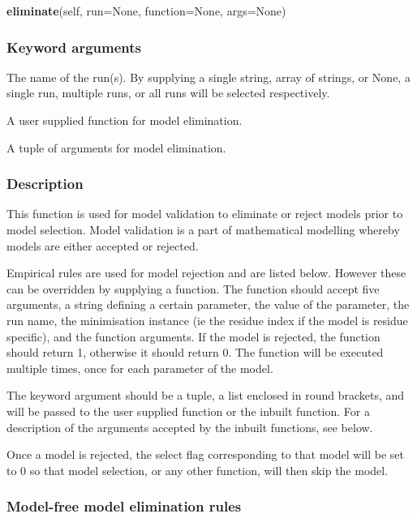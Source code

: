 \textsf{\textbf{eliminate}(self, run=None, function=None, args=None)}


\subsubsection{Keyword arguments}


  The name of the run(s).  By supplying a single string, array of strings, or None, a single run, multiple runs, or all runs will be selected respectively.

  A user supplied function for model elimination.

  A tuple of arguments for model elimination.

\subsubsection{Description}

This function is used for model validation to eliminate or reject models prior to model
selection.  Model validation is a part of mathematical modelling whereby models are either
accepted or rejected.

Empirical rules are used for model rejection and are listed below.  However these can be
overridden by supplying a function.  The function should accept five arguments, a string
defining a certain parameter, the value of the parameter, the run name, the minimisation
instance (ie the residue index if the model is residue specific), and the function
arguments.  If the model is rejected, the function should return 1, otherwise it should
return 0.  The function will be executed multiple times, once for each parameter of the
model.

The 
 keyword argument should be a tuple, a list enclosed in round brackets, and will
be passed to the user supplied function or the inbuilt function.  For a description of the
arguments accepted by the inbuilt functions, see below.

Once a model is rejected, the select flag corresponding to that model will be set to 0 so
that model selection, or any other function, will then skip the model.



\subsubsection{Model-free model elimination rules}

